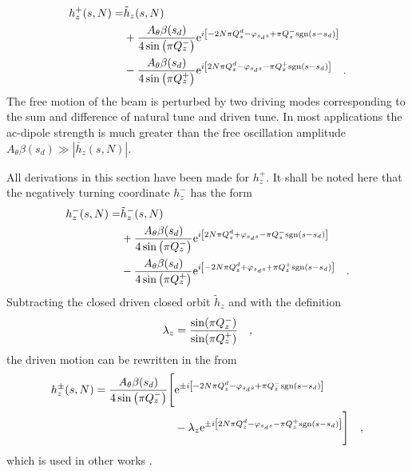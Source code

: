%
\begin{align}
    h_z^+(s, N) =
        &\tilde{h}_z(s, N) \notag \\
        &+ \frac{A_\theta\beta(s_d)}{4\sin\left( \pi Q_z^-\right)}
        \text{e}^{i\left[-2N\pi Q^{d}_{z} - \varphi_{s_ds} + \pi Q_z^-\text{sgn}(s-s_d)\right]} 
        \notag \\
        &- \frac{A_\theta\beta(s_d)}{4\sin\left( \pi Q_z^+\right)}
        \text{e}^{i\left[2N\pi Q^{d}_{z} - \varphi_{s_ds} - \pi Q_z^+\text{sgn}(s-s_d)\right]} 
    \quad .
    \label{eq_driven_simpl2}
\end{align}
%
The free motion of the beam is perturbed by two driving modes corresponding to the sum and difference
of natural tune and driven tune. In most applications the ac-dipole strength is much greater than the free 
oscillation amplitude $A_\theta\beta(s_d) \gg |\bar{h}_z(s,N)|$.

All derivations in this section have been made for $h_z^+$. It shall be noted here that the negatively turning
coordinate $h_z^-$ has the form
%
\begin{align}
    h_z^-(s, N) =
        &\tilde{h}_z^-(s, N) \notag \\
        &+ \frac{A_\theta\beta(s_d)}{4\sin\left( \pi Q_z^-\right)}
        \text{e}^{i\left[2N\pi Q^{d}_{z} + \varphi_{s_ds} - \pi Q_z^-\text{sgn}(s-s_d)\right]} 
        \notag \\
        &- \frac{A_\theta\beta(s_d)}{4\sin\left( \pi Q_z^+\right)}
        \text{e}^{i\left[-2N\pi Q^{d}_{z} + \varphi_{s_ds} + \pi Q_z^+\text{sgn}(s-s_d)\right]} 
    \quad .
    \label{eq_driven_simpl2_minus}
\end{align}
%
Subtracting the closed driven closed orbit $\tilde{h}_z$ and with the definition
%
\begin{equation}
    \lambda_z = \frac{\sin(\pi Q_z^-)}{\sin(\pi Q_z^+)}
    \quad ,
\end{equation}
%
the driven motion can be rewritten in the from
%
\begin{align}
    h_z^\pm(s,N) = 
        \frac{A_\theta\beta(s_d)}{4\sin\left( \pi Q_z^-\right)}
        \Bigg[ 
            &\text{e}^{\pm i\left[-2N\pi Q^{d}_{z} - \varphi_{s_ds} + \pi Q_z^-\text{sgn}(s-s_d)\right]} 
            \notag \\
            &- \lambda_z
             \text{e}^{\pm i\left[2N\pi Q^{d}_{z} - \varphi_{s_ds} - \pi Q_z^+\text{sgn}(s-s_d)\right]} 
        \Bigg]
    \quad ,
    \label{eq_driven_hz_final}
\end{align}
%
which is used in other works \cite{Miyamoto2008, Miyamoto2010}. 

